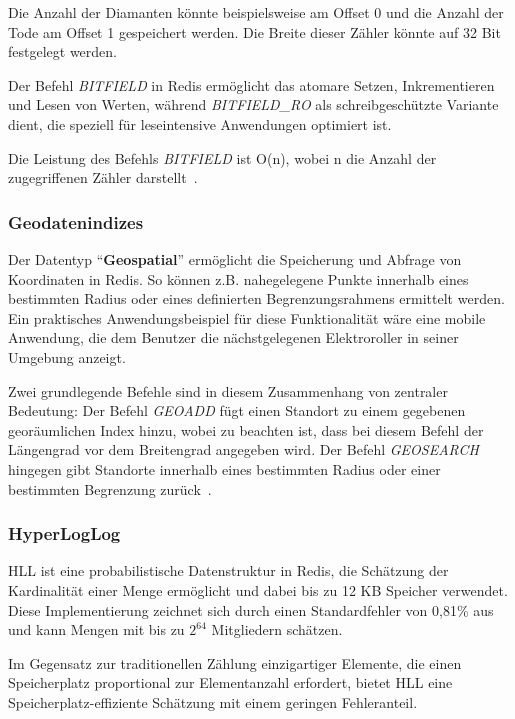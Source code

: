 Die Anzahl der Diamanten könnte beispielsweise am Offset 0 und die Anzahl der Tode am Offset 1 gespeichert werden. Die Breite dieser Zähler könnte auf 32 Bit festgelegt werden.

Der Befehl \emph{BITFIELD} in Redis ermöglicht das atomare Setzen, Inkrementieren und Lesen von Werten, während \emph{BITFIELD\_RO} als schreibgeschützte Variante dient, die speziell für leseintensive Anwendungen optimiert ist.


Die Leistung des Befehls \emph{BITFIELD} ist O(n), wobei n die Anzahl der zugegriffenen Zähler darstellt~\cite{redis_ltd_bitfields_nodate}.


\subsubsection{Geodatenindizes}
Der Datentyp \enquote{\textbf{Geospatial}} ermöglicht die Speicherung und Abfrage von Koordinaten in Redis. So können z.B. nahegelegene Punkte innerhalb eines bestimmten Radius oder eines definierten Begrenzungsrahmens ermittelt werden.
Ein praktisches Anwendungsbeispiel für diese Funktionalität wäre eine mobile Anwendung, die dem Benutzer die nächstgelegenen Elektroroller in seiner Umgebung anzeigt.

Zwei grundlegende Befehle sind in diesem Zusammenhang von zentraler Bedeutung: Der Befehl \emph{GEOADD} fügt einen Standort zu einem gegebenen georäumlichen Index hinzu, wobei zu beachten ist, dass bei diesem Befehl der Längengrad vor dem Breitengrad angegeben wird. Der Befehl \emph{GEOSEARCH} hingegen gibt Standorte innerhalb eines bestimmten Radius oder einer bestimmten Begrenzung zurück~\cite{redis_ltd_geospatial_nodate}.





\subsubsection{HyperLogLog}
\ac{HLL} ist eine probabilistische Datenstruktur in Redis, die Schätzung der Kardinalität einer Menge ermöglicht und dabei bis zu 12 KB Speicher verwendet. Diese Implementierung zeichnet sich durch einen Standardfehler von 0,81\% aus und kann Mengen mit bis zu \(2^{64}\) Mitgliedern schätzen.

Im Gegensatz zur traditionellen Zählung einzigartiger Elemente, die einen Speicherplatz proportional zur Elementanzahl erfordert, bietet \ac{HLL} eine Speicherplatz-effiziente Schätzung mit einem geringen Fehleranteil.

